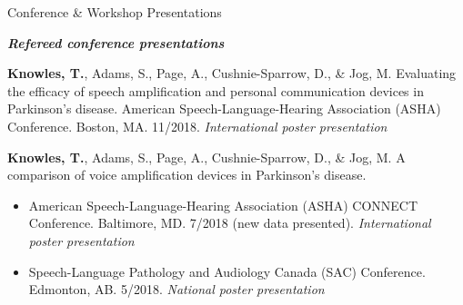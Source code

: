 \documentclass{resume} %
\begin{document}
\begin{rSection}{Conference \& Workshop Presentations}

\begin{center}
	{\bf \emph{Refereed conference presentations}}
\end{center}

	{\bf Knowles, T.}, Adams, S., Page, A., Cushnie-Sparrow, D., \& Jog, M. Evaluating the efficacy of speech amplification and personal communication devices in Parkinson's disease. American Speech-Language-Hearing Association (ASHA) Conference. Boston, MA. 11/2018. \emph{International poster presentation}
	
	{\bf Knowles, T.}, Adams, S., Page, A., Cushnie-Sparrow, D., \& Jog, M. A comparison of voice amplification devices in Parkinson's disease. 
		\begin{itemize}
			\renewcommand\labelitemi{$\cdot$}
			\item American Speech-Language-Hearing Association (ASHA) CONNECT Conference. Baltimore, MD. 7/2018 (new data presented). \emph{International poster presentation}
			\item Speech-Language Pathology and Audiology Canada (SAC) Conference. Edmonton, AB. 5/2018. \emph{National poster presentation}
		\end{itemize}
	

	
	

\end{rSection}
\end{document}
